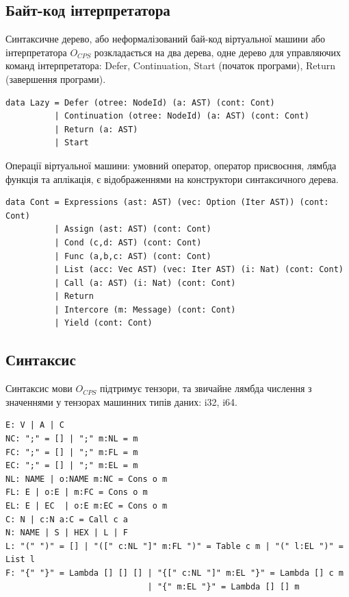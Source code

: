\subsection{Байт-код інтерпретатора}

Синтаксичне дерево, або неформалізований бай-код віртуальної
машини або інтерпретатора $O_{CPS}$ розкладається на два дерева, одне дерево
для управляючих команд інтерпретатора: Defer, Continuation, Start (початок програми),
Return (завершення програми).

\begin{lstlisting}
data Lazy = Defer (otree: NodeId) (a: AST) (cont: Cont)
          | Continuation (otree: NodeId) (a: AST) (cont: Cont)
          | Return (a: AST)
          | Start
\end{lstlisting}

Операції віртуальної машини: умовний оператор, оператор присвоєння, лямбда
функція та аплікація, є відображеннями на конструктори синтаксичного дерева.

\begin{lstlisting}
data Cont = Expressions (ast: AST) (vec: Option (Iter AST)) (cont: Cont)
          | Assign (ast: AST) (cont: Cont)
          | Cond (c,d: AST) (cont: Cont)
          | Func (a,b,c: AST) (cont: Cont)
          | List (acc: Vec AST) (vec: Iter AST) (i: Nat) (cont: Cont)
          | Call (a: AST) (i: Nat) (cont: Cont)
          | Return
          | Intercore (m: Message) (cont: Cont)
          | Yield (cont: Cont)
\end{lstlisting}

\newpage
\subsection{Синтаксис}

Синтаксис мови $O_{CPS}$ підтримує тензори, та звичайне лямбда числення
з значеннями у тензорах машинних типів даних: i32, i64.

\begin{lstlisting}[mathescape=true]
E: V | A | C
NC: ";" = [] | ";" m:NL = m
FC: ";" = [] | ";" m:FL = m
EC: ";" = [] | ";" m:EL = m
NL: NAME | o:NAME m:NC = Cons o m
FL: E | o:E | m:FC = Cons o m
EL: E | EC  | o:E m:EC = Cons o m
C: N | c:N a:C = Call c a
N: NAME | S | HEX | L | F
L: "(" ")" = [] | "([" c:NL "]" m:FL ")" = Table c m | "(" l:EL ")" = List l
F: "{" "}" = Lambda [] [] [] | "{[" c:NL "]" m:EL "}" = Lambda [] c m
                             | "{" m:EL "}" = Lambda [] [] m
\end{lstlisting}

